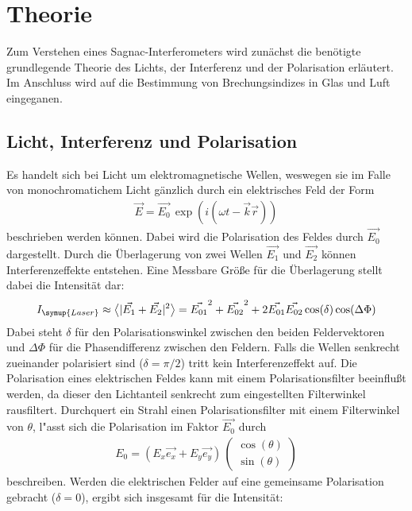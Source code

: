 \section{Theorie}
\label{sec:Theorie}

Zum Verstehen eines Sagnac-Interferometers wird zunächst die benötigte grundlegende Theorie des Lichts, der Interferenz und der Polarisation erl\"autert. Im Anschluss wird
auf die Bestimmung von Brechungsindizes in Glas und Luft eingeganen.

\subsection{Licht, Interferenz und Polarisation}

Es handelt sich bei Licht um elektromagnetische Wellen, weswegen sie im Falle von monochromatichem Licht g\"anzlich durch ein elektrisches Feld der Form
\begin{align}
    \vec{E} = \vec{E_0} \, \exp(i(\omega t - \vec{k}\vec{r}))
\end{align}
beschrieben werden k\"onnen. Dabei wird die Polarisation des Feldes durch $\vec{E_0}$ dargestellt.
Durch die \"Uberlagerung von zwei Wellen $\vec{E_1}$ und $\vec{E_2}$ k\"onnen Interferenzeffekte entstehen.
Eine Messbare Gr\"o\ss{}e f\"ur die \"Uberlagerung stellt dabei die Intensit\"at dar:
\begin{align}
    I_{\symup{Laser}} \approx \bigl< |\vec{E_1}+\vec{E_2}|^2 \bigr> = \vec{E_{01}}^2+\vec{E_{02}}^2 + 2\vec{E_{01}}\vec{E_{02}}\cos(\delta)\cos(\Delta \Phi)
\end{align}
Dabei steht $\delta$ f\"ur den Polarisationswinkel zwischen den beiden Feldervektoren und $\Delta \Phi$ f\"ur die Phasendifferenz zwischen den Feldern.
Falls die Wellen senkrecht zueinander polarisiert sind ($\delta=\pi/2$) tritt kein Interferenzeffekt auf.
Die Polarisation eines elektrischen Feldes kann mit einem Polarisationsfilter beeinflu\ss{}t werden, da dieser den Lichtanteil senkrecht zum eingestellten Filterwinkel rausfiltert.
Durchquert ein Strahl einen Polarisationsfilter mit einem Filterwinkel von $\theta$, l"asst sich die Polarisation im Faktor $\vec{E_0}$ durch
\begin{align}
    E_0 = (E_x\vec{e_x}+E_y\vec{e_y})\,\begin{pmatrix} \cos(\theta) \\ \sin(\theta) \end{pmatrix}
\end{align}
beschreiben. Werden die elektrischen Felder auf eine gemeinsame Polarisation gebracht ($\delta=0$), ergibt sich insgesamt f\"ur die Intensit\"at:
